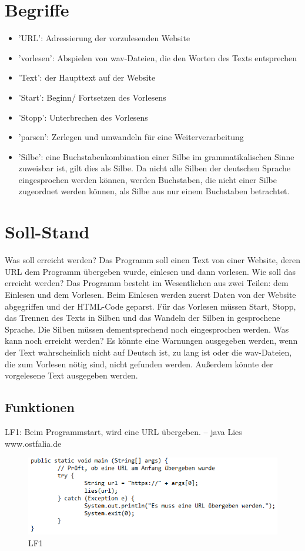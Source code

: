 \documentclass[12pt]{scrartcl}
\begin{document}
\section{Begriffe}
\begin{itemize}
    \item 'URL': Adressierung der vorzulesenden Website
    \item 'vorlesen': Abspielen von wav-Dateien, die den Worten des Texts entsprechen
    \item 'Text': der Haupttext auf der Website
    \item 'Start': Beginn/ Fortsetzen des Vorlesens
    \item 'Stopp': Unterbrechen des Vorlesens
    \item 'parsen': Zerlegen und umwandeln für eine Weiterverarbeitung
    \item 'Silbe': eine Buchstabenkombination einer Silbe im grammatikalischen Sinne zuweisbar ist, gilt dies als Silbe. Da nicht alle Silben der deutschen Sprache eingesprochen werden können, werden Buchstaben, die nicht                 einer Silbe zugeordnet werden können, als Silbe aus nur einem Buchstaben betrachtet.
\end{itemize}

\section{Soll-Stand}
Was soll erreicht werden?
Das Programm soll einen Text von einer Website, deren URL dem Programm übergeben wurde, einlesen und dann vorlesen.
Wie soll das erreicht werden?
Das Programm besteht im Wesentlichen aus zwei Teilen: dem Einlesen und dem Vorlesen. Beim Einlesen werden zuerst Daten von der Website abgegriffen und der HTML-Code geparst. Für das Vorlesen müssen Start, Stopp, das Trennen des Texts in Silben und das Wandeln der Silben in gesprochene Sprache. Die Silben müssen dementsprechend noch eingesprochen werden.
Was kann noch erreicht werden?
Es könnte eine Warnungen ausgegeben werden, wenn der Text wahrscheinlich nicht auf Deutsch ist, zu lang ist oder die wav-Dateien, die zum Vorlesen nötig sind, nicht gefunden werden. Außerdem könnte der vorgelesene Text ausgegeben werden.


\subsection{Funktionen}

LF1: Beim Programmstart, wird eine URL übergeben.
-- java Lies www.ostfalia.de
\begin{figure}[hp!]
 \centering
 \includegraphics[width=1.0\textwidth]{res/LF1}
 \caption{LF1}
 \label{fig: fig1}
\end{figure}
~
\end{document}

